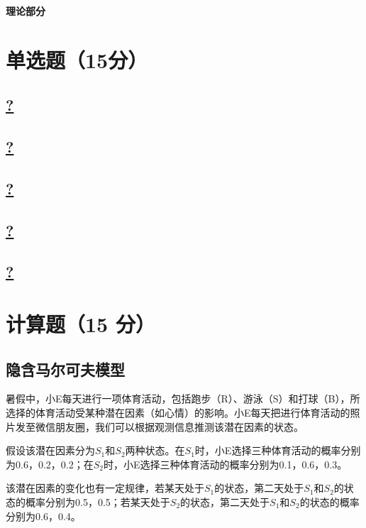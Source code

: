 \documentclass[a4paper]{article}
\begin{document}
\courseheader
{}
\vspace{3mm}
\centerline{\textbf{\Large{理论部分}}}

\section{单选题（15分）}
\subsection{\underline{?}}

\subsection{\underline{?}}

\subsection{\underline{?}}

\subsection{\underline{?}}

\subsection{\underline{?}}

\section{计算题（15 分）}
\subsection{隐含马尔可夫模型}

\hspace{2em}暑假中，小E每天进行一项体育活动，包括跑步（R）、游泳（S）和打球（B），所选择的体育活动受某种潜在因素（如心情）的影响。小E每天把进行体育活动的照片发至微信朋友圈，我们可以根据观测信息推测该潜在因素的状态。

\hspace{2em}假设该潜在因素分为$S_1$和$S_2$两种状态。在$S_1$时，小E选择三种体育活动的概率分别为0.6，0.2，0.2；在$S_2$时，小E选择三种体育活动的概率分别为0.1，0.6，0.3。

\hspace{2em}该潜在因素的变化也有一定规律，若某天处于$S_1$的状态，第二天处于$S_1$和$S_2$的状态的概率分别为0.5，0.5；若某天处于$S_2$的状态，第二天处于$S_1$和$S_2$的状态的概率分别为0.6，0.4。
\end{document}
